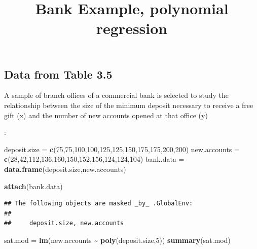 \documentclass[
]{article}
\title{Bank Example, polynomial regression}
\author{}
\date{\vspace{-2.5em}}
\newenvironment{Shaded}{\begin{snugshade}}{\end{snugshade}}
\newcommand{\DecValTok}[1]{\textcolor[rgb]{0.00,0.00,0.81}{#1}}
\newcommand{\FunctionTok}[1]{\textcolor[rgb]{0.13,0.29,0.53}{\textbf{#1}}}
\newcommand{\NormalTok}[1]{#1}
\newcommand{\OtherTok}[1]{\textcolor[rgb]{0.56,0.35,0.01}{#1}}
\newcommand{\SpecialCharTok}[1]{\textcolor[rgb]{0.81,0.36,0.00}{\textbf{#1}}}
\begin{document}
\maketitle

\hypertarget{data-from-table-3.5}{%
\subsection{Data from Table 3.5}\label{data-from-table-3.5}}

A sample of branch offices of a commercial bank is selected to study the
relationship between the size of the minimum deposit necessary to
receive a free gift (x) and the number of new accounts opened at that
office (y)

:

\begin{Shaded}
\begin{Highlighting}[]
\NormalTok{deposit.size }\OtherTok{=} \FunctionTok{c}\NormalTok{(}\DecValTok{75}\NormalTok{,}\DecValTok{75}\NormalTok{,}\DecValTok{100}\NormalTok{,}\DecValTok{100}\NormalTok{,}\DecValTok{125}\NormalTok{,}\DecValTok{125}\NormalTok{,}\DecValTok{150}\NormalTok{,}\DecValTok{175}\NormalTok{,}\DecValTok{175}\NormalTok{,}\DecValTok{200}\NormalTok{,}\DecValTok{200}\NormalTok{)}
\NormalTok{new.accounts }\OtherTok{=} \FunctionTok{c}\NormalTok{(}\DecValTok{28}\NormalTok{,}\DecValTok{42}\NormalTok{,}\DecValTok{112}\NormalTok{,}\DecValTok{136}\NormalTok{,}\DecValTok{160}\NormalTok{,}\DecValTok{150}\NormalTok{,}\DecValTok{152}\NormalTok{,}\DecValTok{156}\NormalTok{,}\DecValTok{124}\NormalTok{,}\DecValTok{124}\NormalTok{,}\DecValTok{104}\NormalTok{)}
\NormalTok{bank.data }\OtherTok{=} \FunctionTok{data.frame}\NormalTok{(deposit.size,new.accounts)}

  
\FunctionTok{attach}\NormalTok{(bank.data)}
\end{Highlighting}
\end{Shaded}

\begin{verbatim}
## The following objects are masked _by_ .GlobalEnv:
## 
##     deposit.size, new.accounts
\end{verbatim}

\begin{Shaded}
\begin{Highlighting}[]
\NormalTok{sat.mod }\OtherTok{=} \FunctionTok{lm}\NormalTok{(new.accounts }\SpecialCharTok{\textasciitilde{}} \FunctionTok{poly}\NormalTok{(deposit.size,}\DecValTok{5}\NormalTok{))}
\FunctionTok{summary}\NormalTok{(sat.mod)}
\end{Highlighting}
\end{Shaded}
\end{document}
